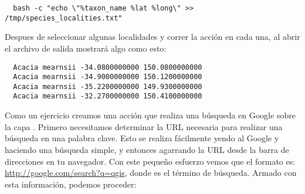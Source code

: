\begin{verbatim}
  bash -c "echo \"%taxon_name %lat %long\" >> /tmp/species_localities.txt"
\end{verbatim} 

Despues de seleccionar algunas localidades y correr la acci\'on en cada una, al abrir
el archivo de salida mostrar\'a algo como esto:

\begin{verbatim}
  Acacia mearnsii -34.0800000000 150.0800000000
  Acacia mearnsii -34.9000000000 150.1200000000
  Acacia mearnsii -35.2200000000 149.9300000000
  Acacia mearnsii -32.2700000000 150.4100000000
\end{verbatim} 

Como un ejercicio creamos una acci\'on que realiza una b\'usqueda en Google sobre la capa 
. Primero necesitamos determinar la URL necesaria para realizar una b\'usqueda en una
palabra clave. Esto se realiza f\'acilmente yendo al Google y haciendo una b\'usqueda
simple, y entonces agarrando la URL desde la barra de direcciones en tu navegador. Con este
peque\~no esfuerzo vemos que el formato es: \url{http://google.com/search?q=qgis},
donde  es el t\'ermino de b\'usqueda. Armado con esta informaci\'on, podemos
proceder:

